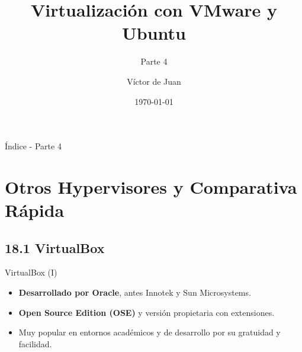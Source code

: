 \documentclass{beamer}
\title{Virtualización con VMware y Ubuntu}
\subtitle{Parte 4}
\author{Víctor de Juan}
\date{\today}
\begin{document}
\begin{frame}
    \titlepage
\end{frame}

\begin{frame}{Índice - Parte 4}
    \tableofcontents[
    hideallsubsections]
\end{frame}

\section{Otros Hypervisores y Comparativa Rápida}

\subsection{18.1 VirtualBox}
\begin{frame}{VirtualBox (I)}
    \begin{itemize}
        \item \textbf{Desarrollado por Oracle}, antes Innotek y Sun Microsystems.
        \item \textbf{Open Source Edition (OSE)} y versión propietaria con extensiones.
        \item Muy popular en entornos académicos y de desarrollo por su gratuidad y facilidad.
    \end{itemize}
\end{frame}
\end{document}
